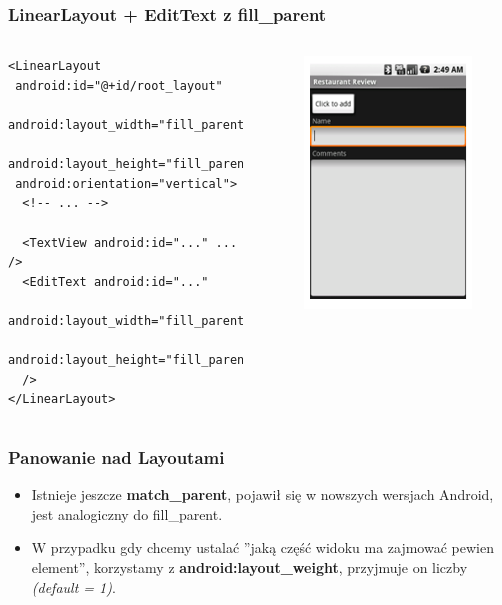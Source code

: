 \documentclass{beamer}
\begin{document}
\begin{frame}[fragile]\frametitle{LinearLayout + EditText z fill\_parent}
 \begin{columns}
  \begin{verbatim}
<LinearLayout
 android:id="@+id/root_layout"
 android:layout_width="fill_parent"
 android:layout_height="fill_parent"
 android:orientation="vertical">
  <!-- ... -->

  <TextView android:id="..." ... />
  <EditText android:id="..."
   android:layout_width="fill_parent"
   android:layout_height="fill_parent" 
  />
</LinearLayout>

  \end{verbatim}
  \begin{figure}
   \includegraphics[width=.7\textwidth]{images/linearlayout_fill}   
  \end{figure}

 \end{columns}
\end{frame}

\begin{frame}[fragile]\frametitle{Panowanie nad Layoutami}
\begin{itemize}
 \item Istnieje jeszcze \textbf{match\_parent}, pojawił się w nowszych wersjach Android, jest analogiczny do fill\_parent.
 \item W przypadku gdy chcemy ustalać ''jaką część widoku ma zajmować pewien element'', korzystamy z \textbf{android:layout\_weight}, przyjmuje on liczby \textit{(default = 1)}.
\end{itemize}
\end{frame}
\end{document}
